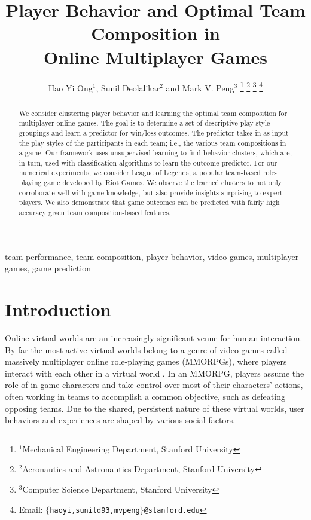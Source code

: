 \documentclass[letterpaper,10 pt,conference]{ieeeconf}
\title{\LARGE \bf
Player Behavior and Optimal Team Composition in\\
Online Multiplayer Games
}
\author{Hao Yi Ong$^{1}$, 
        Sunil Deolalikar$^{2}$ and 
        Mark V. Peng$^{3}$%
\thanks{$^{1}$Mechanical Engineering Department, 
        Stanford University}%
\thanks{$^{2}$Aeronautics and Astronautics Department, 
        Stanford University}%
\thanks{$^{3}$Computer Science Department, 
        Stanford University}%
\thanks{Email: {\tt\small $\{$haoyi,sunild93,mvpeng$\}$@stanford.edu}}
}
\begin{document}
\maketitle
\thispagestyle{plain}
\pagestyle{plain}

\begin{abstract} %

We consider clustering player behavior and learning the optimal team composition for multiplayer online games. The goal is to determine a set of descriptive play style groupings and learn a predictor for win/loss outcomes. The predictor takes in as input the play styles of the participants in each team; i.e., the various team compositions in a game. Our framework uses unsupervised learning to find behavior clusters, which are, in turn, used with classification algorithms to learn the outcome predictor. For our numerical experiments, we consider League of Legends, a popular team-based role-playing game developed by Riot Games. We observe the learned clusters to not only corroborate well with game knowledge, but also provide insights surprising to expert players. We also demonstrate that game outcomes can be predicted with fairly high accuracy given team composition-based features.

\end{abstract}

\begin{keywords}

team performance, team composition, player behavior, video games, multiplayer games, game prediction

\end{keywords}

\section{Introduction}

Online virtual worlds are an increasingly significant venue for human interaction. By far the most active virtual worlds belong to a genre of video games called massively multiplayer online role-playing games (MMORPGs), where players interact with each other in a virtual world \cite{TSF:13}. In an MMORPG, players assume the role of in-game characters and take control over most of their characters' actions, often working in teams to accomplish a common objective, such as defeating opposing teams. Due to the shared, persistent nature of these virtual worlds, user behaviors and experiences are shaped by various social factors. 
\end{document}
